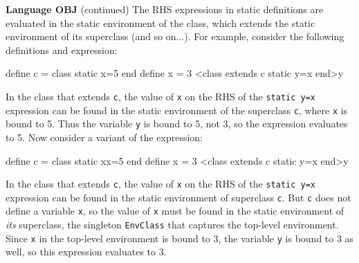 \begin{minipage}[t]{\sw}
\slidenumber
\LARGE
{\bf Language OBJ} (continued)\exx
The RHS expressions in static definitions are evaluated
in the static environment of the class,
which extends the static environment of its superclass (and so on...).
For example, consider the following definitions and expression:
{\Large
\begin{qv}
define c = class static x=5 end
define x = 3
<class extends c static y=x end>y
\end{qv}
}
In the class that extends \verb'c', 
the value of \verb'x' on the RHS of the \verb'static y=x' expression
can be found in the static environment of the superclass \verb'c',
where \verb'x' is bound to 5.
Thus the variable \verb'y' is bound to 5, not 3,
so the expression evaluates to 5.\exx
Now consider a variant of the expression:
{\Large
\begin{qv}
define c = class static xx=5 end
define x = 3
<class extends c static y=x end>y
\end{qv}
}
In the class that extends \verb'c', 
the value of \verb'x' on the RHS of the \verb'static y=x' expression
can be found in the static environment of superclass \verb'c'.
But \verb'c' does not define a variable \verb'x',
so the value of \verb'x' must be found
in the static environment of {\em its} superclass,
the singleton \verb'EnvClass' that captures the top-level environment.
Since \verb'x' in the top-level environment is bound to 3,
the variable \verb'y' is bound to 3 as well,
so this expression evaluates to 3.
\end{minipage}
